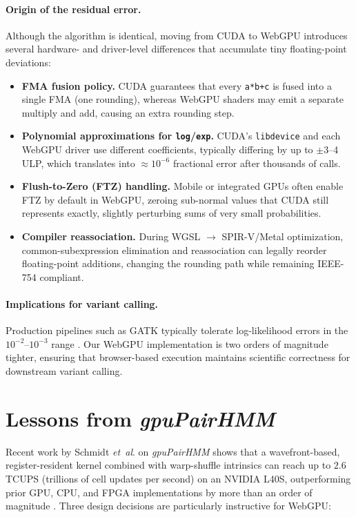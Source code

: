 \documentclass[PhD]{PHlab-thesis}
\begin{document}
\paragraph{Origin of the residual error.}
Although the algorithm is identical, moving from CUDA to WebGPU introduces several hardware- and driver-level differences that accumulate tiny floating-point deviations:
\begin{itemize}
  \item \textbf{FMA fusion policy.} CUDA guarantees that every \texttt{a*b+c} is fused into a single FMA (one rounding), whereas WebGPU shaders may emit a separate multiply and add, causing an extra rounding step.
  \item \textbf{Polynomial approximations for \texttt{log}/\texttt{exp}.} CUDA's \texttt{libdevice} and each WebGPU driver use different coefficients, typically differing by up to $\pm$3–4 ULP, which translates into $\approx10^{-6}$ fractional error after thousands of calls.
  \item \textbf{Flush-to-Zero (FTZ) handling.} Mobile or integrated GPUs often enable FTZ by default in WebGPU, zeroing sub-normal values that CUDA still represents exactly, slightly perturbing sums of very small probabilities.
  \item \textbf{Compiler reassociation.} During WGSL $\rightarrow$ SPIR-V/Metal optimization, common-subexpression elimination and reassociation can legally reorder floating-point additions, changing the rounding path while remaining IEEE-754 compliant.
\end{itemize}

\paragraph{Implications for variant calling.}
Production pipelines such as GATK typically tolerate log-likelihood errors in the $10^{-2}$–$10^{-3}$ range \cite{McKenna2010}. Our WebGPU implementation is two orders of magnitude tighter, ensuring that browser-based execution maintains scientific correctness for downstream variant calling.





\section{Lessons from \textit{gpuPairHMM}}
Recent work by Schmidt \emph{et~al}. on \textit{gpuPairHMM} shows that a wavefront-based, register-resident kernel combined with warp-shuffle intrinsics can reach up to $2.6$ TCUPS (trillions of cell updates per second) on an NVIDIA L40S, outperforming prior GPU, CPU, and FPGA implementations by more than an order of magnitude \cite{Schmidt2024-gpuPairHMM}. Three design decisions are particularly instructive for WebGPU:
\end{document}
